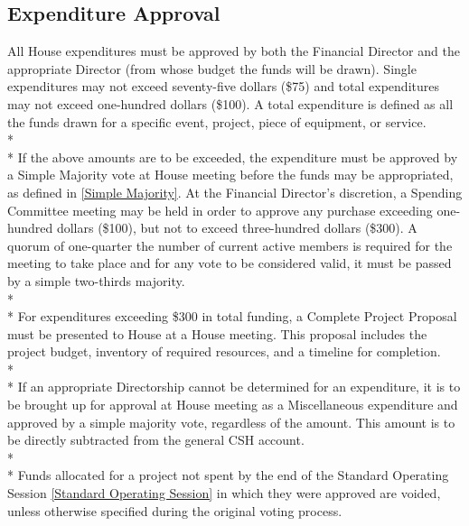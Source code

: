 \documentclass{article}
\newcommand{\bsection}[1]{\subsection{#1} \label{#1}}
\begin{document}
\bsection{Expenditure Approval}
All House expenditures must be approved by both the Financial Director and the appropriate Director (from whose budget the funds will be drawn). Single expenditures may not exceed seventy-five dollars (\$75) and total expenditures may not exceed one-hundred dollars (\$100). A total expenditure is defined as all the funds drawn for a specific event, project, piece of equipment, or service.
\\* \\*
If the above amounts are to be exceeded, the expenditure must be approved by a Simple Majority vote at House meeting before the funds may be appropriated, as defined in \ref{Simple Majority}. At the Financial Director's discretion, a Spending Committee meeting may be held in order to approve any purchase exceeding one-hundred dollars (\$100), but not to exceed three-hundred dollars (\$300). A quorum of one-quarter the number of current active members is required for the meeting to take place and for any vote to be considered valid, it must be passed by a simple two-thirds majority.
\\*\\*
For expenditures exceeding \$300 in total funding, a Complete Project Proposal must be presented to House at a House meeting. This proposal includes the project budget, inventory of required resources, and a timeline for completion.
\\* \\*
If an appropriate Directorship cannot be determined for an expenditure, it is to be brought up for approval at House meeting as a Miscellaneous expenditure and approved by a simple majority vote, regardless of the amount. This amount is to be directly subtracted from the general CSH account. 
\\* \\*
Funds allocated for a project not spent by the end of the Standard Operating Session \ref{Standard Operating Session} in which they were approved are voided, unless otherwise specified during the original voting process.
\end{document}
